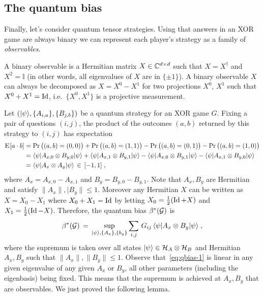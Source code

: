 \subsection{The quantum bias}

Finally, let's consider quantum tensor strategies. Using that answers in an XOR game are always binary we can represent each player's strategy as a family of \emph{observables}.

\begin{definition}
A binary observable is a Hermitian matrix $X\in \mathbb{C}^{d\times d}$ such that $X=X^\dagger$ and $X^2=\mathbb{I}$ (in other words, all eigenvalues of $X$ are in $\{\pm 1\}$). A binary observable $X$ can always be decomposed as $X = X^0 - X^1$ for two projections $X^0$, $X^1$ such that $X^0+X^1 = \mathop{\rm Id}\nolimits$, i.e.\ $\{X^0,X^1\}$ is a projective measurement. 
\end{definition}

Let $(|\psi\rangle,\{A_{i,a}\},\{B_{j,b}\})$ be a quantum strategy for an XOR game $G$. Fixing a pair of questions $(i,j)$, the product of the outcomes $(a,b)$ returned by this strategy to $(i,j)$ has expectation
\begin{align*}
\textsc{E}_{}[a\cdot b] &= \Pr\big( (a,b)=(0,0) \big) + \Pr\big( (a,b)=(1,1) \big) - \Pr\big( (a,b)=(0,1) \big)  - \Pr\big( (a,b)=(1,0) \big) \\
&=  \langle\psi| A_{x,0} \otimes B_{y,0} |\psi\rangle + \langle\psi| A_{x,1} \otimes B_{y,1} |\psi\rangle - \langle\psi| A_{x,0} \otimes B_{y,1} |\psi\rangle - \langle\psi| A_{x,1} \otimes B_{y,0}|\psi\rangle\\
&=  \langle\psi|A_x \otimes A_y |\psi\rangle \,\in\,[-1,1]\;,
\end{align*}
where $A_x = A_{x,0}-A_{x,1}$ and $B_y=B_{y,0}-B_{y,1}$. Note that $A_x,B_y$ are Hermitian and satisfy $\|A_x\|,|B_y\|\leq 1$. Moreover any Hermitian $X$ can be written as $X=X_0-X_1$ where $X_0+X_1=\mathop{\rm Id}\nolimits$ by letting $X_0 = \frac{1}{2}(\mathop{\rm Id}\nolimits+X)$ and $X_1=\frac{1}{2}(\mathop{\rm Id}\nolimits-X)$. Therefore, the quantum bias $\beta^*(\mathcal{G})$ is 
\begin{equation}\label{eq:qbias-1}
\beta^*(\mathcal{G}) \,=\, \sup_{|\psi\rangle,\{A_x\},\{b_y\}} \sum_{i,j} \,G_{ij}\, \langle\psi| A_x \otimes B_y |\psi\rangle\;,
\end{equation}
where the supremum is taken over all states $|\psi\rangle\in \mathcal{H}_A\otimes \mathcal{H}_B$ and Hermitian $A_x,B_y$ such that $\|A_x\|,\|B_y\|\leq 1$. Observe that~\eqref{eq:qbias-1} is linear in any given eigenvalue of any given $A_x$ or $B_y$, all other parameters (including the eigenbasis) being fixed. This means that the supremum is achieved at $A_x,B_y$ that are observables. We just proved the following lemma.

